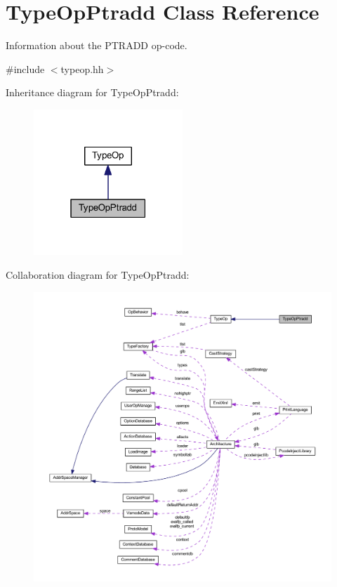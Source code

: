 \hypertarget{class_type_op_ptradd}{}\section{Type\+Op\+Ptradd Class Reference}
\label{class_type_op_ptradd}


Information about the P\+T\+R\+A\+DD op-\/code.  




{\ttfamily \#include $<$typeop.\+hh$>$}



Inheritance diagram for Type\+Op\+Ptradd\+:
\nopagebreak
\begin{figure}[H]
\begin{center}
\leavevmode
\includegraphics[width=159pt]{class_type_op_ptradd__inherit__graph}
\end{center}
\end{figure}


Collaboration diagram for Type\+Op\+Ptradd\+:
\nopagebreak
\begin{figure}[H]
\begin{center}
\leavevmode
\includegraphics[width=350pt]{class_type_op_ptradd__coll__graph}
\end{center}
\end{figure}
